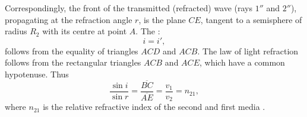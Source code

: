 Correspondingly, the front of the transmitted (refracted) wave
(rays $\mathit{1}''$ and $\mathit{2}''$), propagating at the refraction angle $r$, is the plane $CE$, tangent to a semisphere of radius $R_{2}$ with its centre at point $A$. The : 
\begin{equation*}%
i = i', 
\end{equation*}
follows from the equality of triangles $ACD$ and $ACB$. The law of light refraction follows from the rectangular triangles $ACB$ and $ACE$, which have a common hypotenuse. Thus
\begin{equation*}%
\frac{\sin i}{\sin r} = \frac{\overline{BC}}{\overline{AE}} = \frac{v_{1}}{v_{2}} = n_{21}, 
\end{equation*}
where $n_{21}$ is the relative refractive index of the second and first media .


